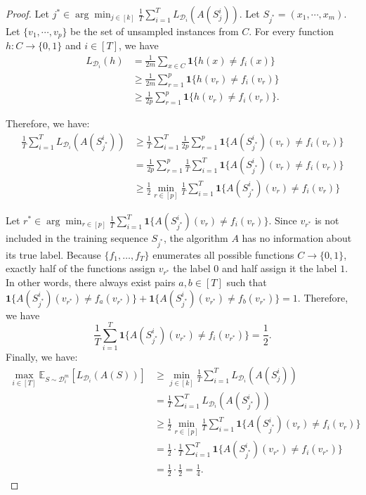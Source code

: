 \documentclass[openany, amssymb, psamsfonts]{amsart}
\theoremstyle{definition}
\numberwithin{equation}{section}
\begin{document}
\begin{proof}
Let $j^* \in \arg \min_{j \in [k]} \frac{1}{T} \sum_{i=1}^T L_{\mathcal{D}_i}(A(S_j^i))$. Let $S_{j^*} = (x_1, \cdots, x_m)$. Let $\{v_1, \cdots, v_p\}$ be the set of unsampled instances from $C$. For every function $h \colon C \to \{0,1\}$ and $i \in [T]$, we have 
\begin{align*}
L_{\mathcal{D}_i}(h) &= \frac{1}{2m} \sum_{x \in C} \mathbf{1}\{h(x) \neq f_i(x)\} \\
&\geq \frac{1}{2m} \sum_{r=1}^p \mathbf{1}\{h(v_r) \neq f_i(v_r)\} \\
&\geq \frac{1}{2p} \sum_{r=1}^p \mathbf{1}\{h(v_r) \neq f_i(v_r)\}.
\end{align*}

Therefore, we have:
\begin{align*}
\frac{1}{T} \sum_{i=1}^T L_{\mathcal{D}_i}(A(S_{j^*}^i)) 
&\geq \frac{1}{T} \sum_{i=1}^T \frac{1}{2p} \sum_{r=1}^p \mathbf{1}\{A(S_{j^*}^i)(v_r) \neq f_i(v_r)\} \\
&= \frac{1}{2p} \sum_{r=1}^p \frac{1}{T} \sum_{i=1}^T \mathbf{1}\{A(S_{j^*}^i)(v_r) \neq f_i(v_r)\} \\
&\geq \frac{1}{2} \min_{r \in [p]} \frac{1}{T} \sum_{i=1}^T \mathbf{1}\{A(S_{j^*}^i)(v_r) \neq f_i(v_r)\}
\end{align*}

Let $r^* \in \arg\min_{r \in [p]} \frac{1}{T} \sum_{i=1}^T \mathbf{1}\{A(S_{j^*}^i)(v_r) \neq f_i(v_r)\}$. Since $v_{r^*}$ is not included in the training sequence $S_{j^*}$, the algorithm $A$ has no information about its true label. Because $\{f_1, \dots, f_T\}$ enumerates all possible functions $C \to \{0,1\}$, exactly half of the functions assign $v_{r^*}$ the label $0$ and half assign it the label $1$. In other words, there always exist pairs $a, b \in [T]$ such that $\mathbf{1}\{A(S_{j^*}^i)(v_{r^*}) \neq f_a(v_{r^*})\} + \mathbf{1}\{A(S_{j^*}^i)(v_{r^*}) \neq f_b(v_{r^*})\} = 1$.
Therefore, we have
\[
\frac{1}{T} \sum_{i=1}^T \mathbf{1}\{A(S_{j^*}^i)(v_{r^*}) \neq f_i(v_{r^*})\} = \frac{1}{2}.
\]
Finally, we have: 
\begin{align*}
\max_{i \in [T]} \mathbb{E}_{S \sim \mathcal{D}_i^m} [L_{\mathcal{D}_i}(A(S))]
&\geq \min_{j \in [k]} \frac{1}{T} \sum_{i=1}^T L_{\mathcal{D}_i}(A(S_j^i)) \\
&= \frac{1}{T} \sum_{i=1}^T L_{\mathcal{D}_i}(A(S_{j^*}^i)) \\
&\geq \frac{1}{2} \min_{r \in [p]} \frac{1}{T} \sum_{i=1}^T \mathbf{1}\{A(S_{j^*}^i)(v_r) \neq f_i(v_r)\} \\
&= \frac{1}{2} \cdot \frac{1}{T} \sum_{i=1}^T \mathbf{1}\{A(S_{j^*}^i)(v_{r^*}) \neq f_i(v_{r^*})\} \\
&= \frac{1}{2} \cdot \frac{1}{2} = \frac{1}{4}.
\end{align*}
\end{proof}
\end{document}
